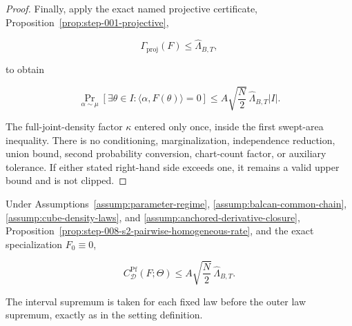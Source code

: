 \begin{proof}
Finally, apply the exact named projective certificate,
Proposition~\ref{prop:step-001-projective},

\begin{equation}
\label{eq:appendix-display-240}
\Gamma_{\mathrm{proj}}(F)\leq\widehat\Lambda_{B,T},
\end{equation}

to obtain

\begin{equation}
\label{eq:appendix-display-241}
\Pr_{\alpha\sim\mu}
[\exists\theta\in I:\langle\alpha,F(\theta)\rangle=0]
\leq
A\sqrt{\frac N2}\,
\widehat\Lambda_{B,T}\lvert I\rvert.
\end{equation}

The full-joint-density factor \(\kappa\) entered only once, inside the first swept-area inequality.
There is no conditioning, marginalization, independence reduction, union bound, second probability conversion,
chart-count factor, or auxiliary tolerance. If either stated right-hand side exceeds one, it remains a valid
upper bound and is not clipped. 
\end{proof}

\begin{proposition}
\label{prop:step-008-s2-pf-closure}

Under Assumptions~\ref{assump:parameter-regime}, \ref{assump:balcan-common-chain},
\ref{assump:cube-density-laws}, and \ref{assump:anchored-derivative-closure},
Proposition~\ref{prop:step-008-s2-pairwise-homogeneous-rate}, and the exact specialization
\(F_0\equiv0\),

\begin{equation}
\label{eq:appendix-display-242}
C^{\mathrm{Pf}}_{\mathcal D}(F;\Theta)
\leq
A\sqrt{\frac N2}\,\widehat\Lambda_{B,T}.
\end{equation}

The interval supremum is taken for each fixed law before the outer law supremum, exactly as in the setting
definition.


\end{proposition}

